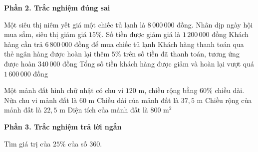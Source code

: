 \textbf{Phần 2. Trắc nghiệm đúng sai}

\begin{ex} %
Một siêu thị niêm yết giá một chiếc tủ lạnh là $8\,000\,000$ đồng. Nhân dịp ngày hội mua sắm, siêu thị giảm giá $15\%$.
\choiceTF
{\True Số tiền được giảm giá là $1\,200\,000$ đồng}
{\True Khách hàng cần trả $6\,800\,000$ đồng để mua chiếc tủ lạnh}
{\True Khách hàng thanh toán qua thẻ ngân hàng được hoàn lại thêm $5\%$ trên số tiền đã thanh toán, tương ứng được hoàn $340\,000$ đồng}
{Tổng số tiền khách hàng được giảm và hoàn lại vượt quá $1\,600\,000$ đồng}
\end{ex}

\begin{ex} %
Một mảnh đất hình chữ nhật có chu vi $120\text{ m}$, chiều rộng bằng $60\%$ chiều dài.
\choiceTF
{\True Nửa chu vi mảnh đất là $60\text{ m}$}
{\True Chiều dài của mảnh đất là $37{,}5\text{ m}$}
{\True Chiều rộng của mảnh đất là $22{,}5\text{ m}$}
{Diện tích của mảnh đất là $800\text{ m}^2$}
\end{ex}

\textbf{Phần 3. Trắc nghiệm trả lời ngắn}

\begin{ex} %
Tìm giá trị của $25\%$ của số $360$.
\end{ex}

